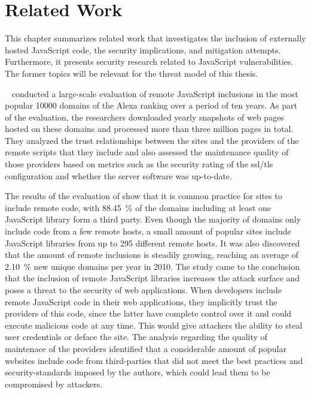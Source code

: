 \chapter{Related Work}
\label{sec.relatedwork}

This chapter summarizes related work that investigates the inclusion of externally hosted JavaScript code, the security implications, and mitigation attempts. Furthermore, it presents security research related to JavaScript vulnerabilities. The former topics will be relevant for the threat model of this thesis.

\citeauthor{JSinclusions}~\cite{JSinclusions} conducted a large-scale evaluation of remote JavaScript inclusions in the most popular \num[round-precision=0]{10000} domains of the Alexa ranking over a period of ten years. As part of the evaluation, the researchers downloaded yearly snapshots of web pages hosted on these domains and processed more than three million pages in total. They analyzed the trust relationships between the sites and the providers of the remote scripts that they include and also assessed the maintenance quality of those providers based on metrics such as the security rating of the \acs{ssl}/\acs{tls} configuration and whether the server software was up-to-date.

The results of the evaluation of \citeauthor{JSinclusions} show that it is common practice for sites to include remote code, with \SI[round-precision=2]{88.45}{\percent} of the domains including at least one JavaScript library form a third party. Even though the majority of domains only include code from a few remote hosts, a small amount of popular sites include JavaScript libraries from up to \num[round-precision=0]{295} different remote hosts. It was also discovered that the amount of remote inclusions is steadily growing, reaching an average of \SI[round-precision=2]{2.10}{\percent} new unique domains per year in 2010. The study came to the conclusion that the inclusion of remote JavaScript libraries increases the attack surface and poses a threat to the security of web applications. When developers include remote JavaScript code in their web applications, they implicitly trust the providers of this code, since the latter have complete control over it and could execute malicious code at any time. This would give attackers the ability to steal user credentials or deface the site. The analysis regarding the quality of maintenace of the providers identified that a considerable amount of popular websites include code from third-parties that did not meet the best practices and security-standards imposed by the authors, which could lead them to be compromised by attackers. \cite{JSinclusions}

